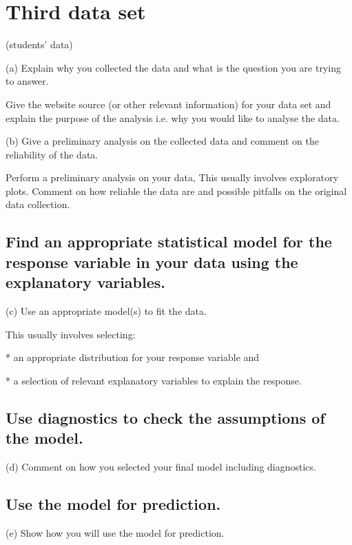 \section{Third data set}

(students’ data)

(a) Explain why you collected the data and what is the question you are trying to answer.

Give the website source (or other relevant information) for your data set and explain the purpose of the analysis i.e. why you would like to analyse the data.

(b) Give a preliminary analysis on the collected data and comment on the reliability of the data.

Perform a preliminary analysis on your data, This usually involves exploratory plots. Comment on how reliable the data are and possible pitfalls on the original data collection.

\subsection{Find an appropriate statistical model for the response variable in your data using the explanatory variables.}

(c) Use an appropriate model(s) to fit the data.

This usually involves selecting:

* an appropriate distribution for your response variable and

* a selection of relevant explanatory variables to explain the response.

\subsection{Use diagnostics to check the assumptions of the model.}

(d) Comment on how you selected your final model including diagnostics.

\subsection{Use the model for prediction.}
  
(e) Show how you will use the model for prediction.
